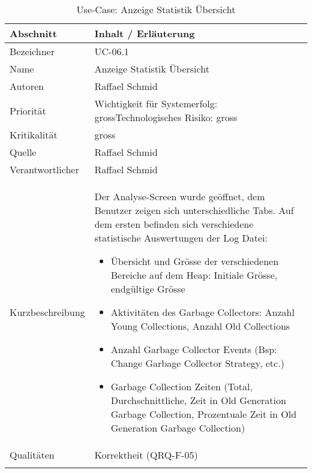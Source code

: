 \begin{longtable}{|p{4cm}|p{10.5cm}|}
\hline
   \textbf{Abschnitt} & \textbf{Inhalt / Erläuterung} \\\hline
   Bezeichner & UC-06.1\\\hline
   Name & Anzeige Statistik Übersicht\\\hline
   Autoren & Raffael Schmid\\\hline
   Priorität & Wichtigkeit für Systemerfolg: gross\newline Technologisches Risiko: gross\\\hline
   Kritikalität & gross\\\hline
   Quelle & Raffael Schmid\\\hline
   Verantwortlicher & Raffael Schmid\\\hline
   Kurzbeschreibung & Der Analyse-Screen wurde geöffnet, dem Benutzer zeigen sich unterschiedliche Tabs. Auf dem ersten befinden sich verschiedene statistische Auswertungen der Log Datei:
   \begin{itemize}
	\item Übersicht und Grösse der verschiedenen Bereiche auf dem Heap: Initiale Grösse, endgültige Grösse
	\item Aktivitäten des Garbage Collectors: Anzahl Young Collections, Anzahl Old Collections
	\item Anzahl Garbage Collector Events (Bsp: Change Garbage Collector Strategy, etc.)
	\item Garbage Collection Zeiten (Total, Durchschnittliche, Zeit in Old Generation Garbage Collection, Prozentuale Zeit in Old Generation Garbage Collection)
   \end{itemize}
 \\\hline
   Qualitäten & Korrektheit (QRQ-F-05)\\\hline
\caption{Use-Case: Anzeige Statistik Übersicht}
\end{longtable}

